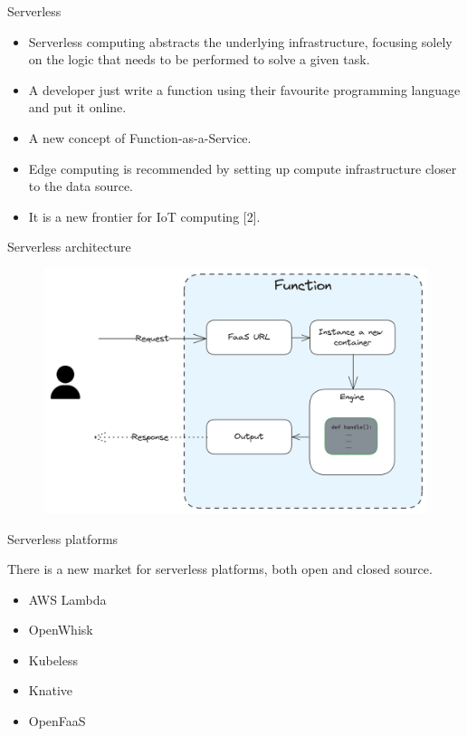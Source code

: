 \begin{frame}{Serverless}

\begin{itemize}
\item<1-> Serverless computing abstracts the underlying infrastructure, focusing solely on the logic that needs to be performed to solve a given task.

\item<2-> A developer just write a function using their favourite programming language and put it online.

\item<3-> A new concept of Function-as-a-Service.

\item<4-> Edge computing is recommended by setting up compute infrastructure closer to the data source.

\item<5-> It is a new frontier for IoT computing [2].

\end{itemize}
    
\end{frame}


\begin{frame}{Serverless architecture}
    \begin{figure}
        \centering
        \includegraphics[width=1\linewidth]{static/Untitled-2023-09-27-1503(4).png}
    \end{figure}
\end{frame}

\begin{frame}{Serverless platforms}

There is a new market for serverless platforms, both open and closed source.

\begin{itemize}
    \item AWS Lambda
    \item OpenWhisk
    \item Kubeless
    \item Knative
    \item OpenFaaS
\end{itemize}
    
\end{frame}

